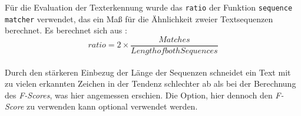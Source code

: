 Für die Evaluation der Texterkennung wurde das \verb|ratio| der Funktion \verb|sequence matcher| verwendet, das ein Maß für die Ähnlichkeit zweier Textsequenzen berechnet. Es berechnet sich aus \cite{difflib}:\\
\begin{equation}ratio = 2 \times \frac{Matches}{Length of both Sequences}\end{equation} \\
Durch den stärkeren Einbezug der Länge der Sequenzen schneidet ein Text mit zu vielen erkannten Zeichen in der Tendenz schlechter ab als bei der Berechnung des \textit{F-Scores}, was hier angemessen erschien. Die Option, hier dennoch den \textit{F-Score} zu verwenden kann optional verwendet werden.